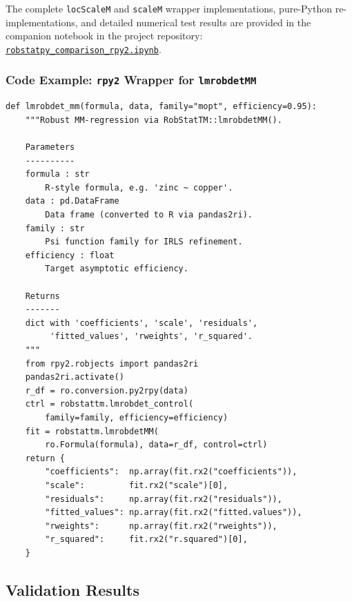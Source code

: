 \documentclass[11pt, a4paper]{article}
\begin{document}
\noindent
The complete \texttt{locScaleM} and \texttt{scaleM} wrapper implementations,
pure-Python re-implementations, and detailed numerical test results are
provided in the companion notebook in the project repository:
\href{https://github.com/Aakarsh751/robstattm-pyport-AG-prop/blob/main/robstattm/python/robstatpy\_comparison\_rpy2.ipynb}%
{\texttt{robstatpy\_comparison\_rpy2.ipynb}}.

\subsubsection*{Code Example: \texttt{rpy2} Wrapper for \texttt{lmrobdetMM}}

\begin{lstlisting}[style=python, caption={rpy2 wrapper for lmrobdetMM (regression; demonstrated with mopt family, efficiency=0.95)}]
def lmrobdet_mm(formula, data, family="mopt", efficiency=0.95):
    """Robust MM-regression via RobStatTM::lmrobdetMM().

    Parameters
    ----------
    formula : str
        R-style formula, e.g. 'zinc ~ copper'.
    data : pd.DataFrame
        Data frame (converted to R via pandas2ri).
    family : str
        Psi function family for IRLS refinement.
    efficiency : float
        Target asymptotic efficiency.

    Returns
    -------
    dict with 'coefficients', 'scale', 'residuals',
         'fitted_values', 'rweights', 'r_squared'.
    """
    from rpy2.robjects import pandas2ri
    pandas2ri.activate()
    r_df = ro.conversion.py2rpy(data)
    ctrl = robstattm.lmrobdet_control(
        family=family, efficiency=efficiency)
    fit = robstattm.lmrobdetMM(
        ro.Formula(formula), data=r_df, control=ctrl)
    return {
        "coefficients":  np.array(fit.rx2("coefficients")),
        "scale":         fit.rx2("scale")[0],
        "residuals":     np.array(fit.rx2("residuals")),
        "fitted_values": np.array(fit.rx2("fitted.values")),
        "rweights":      np.array(fit.rx2("rweights")),
        "r_squared":     fit.rx2("r.squared")[0],
    }
\end{lstlisting}


\subsection{Validation Results}
\end{document}
